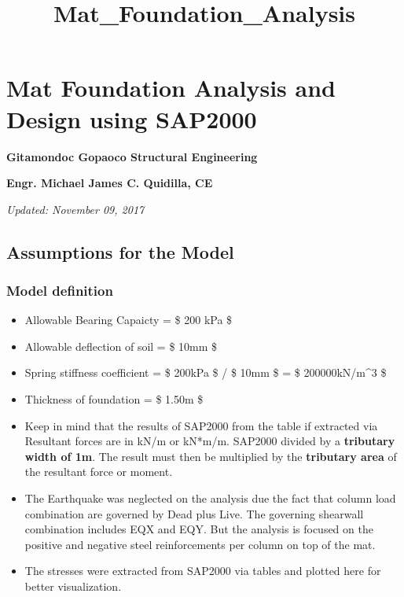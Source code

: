 \documentclass[11pt]{article}
\title{Mat\_Foundation\_Analysis}
\begin{document}
    
    
    \maketitle
    
    

    
    \section{Mat Foundation Analysis and Design using
SAP2000}\label{mat-foundation-analysis-and-design-using-sap2000}

\textbf{Gitamondoc Gopaoco Structural Engineering}

\textbf{Engr. Michael James C. Quidilla, CE}

\emph{Updated: November 09, 2017}

    \subsection{Assumptions for the Model}\label{assumptions-for-the-model}

    \subsubsection{Model definition}\label{model-definition}

    \begin{itemize}
\item
  Allowable Bearing Capaicty = \$ 200 kPa \$
\item
  Allowable deflection of soil = \$ 10mm \$
\item
  Spring stiffness coefficient = \$ 200kPa \$ / \$ 10mm \$ = \$
  200000kN/m\^{}3 \$
\item
  Thickness of foundation = \$ 1.50m \$
\item
  Keep in mind that the results of SAP2000 from the table if extracted
  via Resultant forces are in kN/m or kN*m/m. SAP2000 divided by a
  \textbf{tributary width of 1m}. The result must then be multiplied by
  the \textbf{tributary area} of the resultant force or moment.
\item
  The Earthquake was neglected on the analysis due the fact that column
  load combination are governed by Dead plus Live. The governing
  shearwall combination includes EQX and EQY. But the analysis is
  focused on the positive and negative steel reinforcements per column
  on top of the mat.
\item
  The stresses were extracted from SAP2000 via tables and plotted here
  for better visualization.
\end{itemize}
\end{document}
